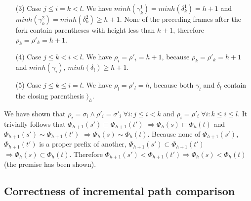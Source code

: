 \documentclass[AMA,STIX1COL]{WileyNJD-v2}
\newcommand{\Xr}{\rangle}
\begin{document}
\begin{proofEnd}
\begin{itemize}[itemsep=0.5em, topsep=0.5em]
    \item[(3)]
        Case $j \leq i = k < l$. We have
        $minh (\gamma^1_k) = minh (\delta^1_k) = h + 1$ and
        $minh (\gamma^2_k) = minh (\delta^2_k) \geq h + 1$.
        None of the preceding frames after the fork contain parentheses with height less than $h + 1$,
        therefore $\rho_k = \rho'_k = h + 1$.

    \item[(4)]
        Case $j \leq k < i < l$.
        We have $\rho_i = \rho'_i = h + 1$,
        because $\rho_k = \rho'_k = h + 1$ and $minh(\gamma_i)$, $minh(\delta_i) \geq h + 1$.

    \item[(5)]
        Case $j \leq k \leq i = l$.
        We have $\rho_l = \rho'_l = h$,
        because both $\gamma_l$ and $\delta_l$ contain the closing parenthesis $\Xr_{h}$.
    \end{itemize}
    We have shown that $\rho_i = \sigma_i \wedge \rho'_i = \sigma'_i \;\forall i: j \leq i < k$
    and $\rho_i = \rho'_i \;\forall i: k \leq i \leq l$.
    It trivially follows that $\Phi_{h+1}(s') \sqsubset \Phi_{h+1}(t')$ $\Rightarrow \Phi_{h}(s) \sqsubset \Phi_{h}(t)$
    and $\Phi_{h+1}(s') \sim \Phi_{h+1}(t')$ $\Rightarrow \Phi_{h}(s) \sim \Phi_{h}(t)$.
    Because none of $\Phi_{h+1}(s')$, $\Phi_{h+1}(t')$ is a proper prefix of another,
    $\Phi_{h+1}(s') \subset \Phi_{h+1}(t')$ $\Rightarrow \Phi_{h}(s) \subset \Phi_{h}(t)$.
    Therefore $\Phi_{h+1}(s') < \Phi_{h+1}(t') \Rightarrow \Phi_{h}(s) < \Phi_{h}(t)$
    (the premise has been shown).
\end{proofEnd}



\subsection*{Correctness of incremental path comparison}

\end{document}
